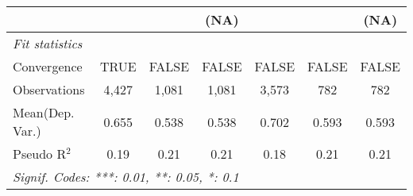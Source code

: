 \begin{tabular}{lcccccc}
                           &               &             & (NA)   &               &         & (NA)\\   
   \midrule
   \emph{Fit statistics}\\
   Convergence             &TRUE           & FALSE       & FALSE  & FALSE         & FALSE   & FALSE\\  
   Observations            & 4,427         & 1,081       & 1,081  & 3,573         & 782     & 782\\  
Mean(Dep. Var.) & 0.655 & 0.538 & 0.538 & 0.702 & 0.593 & 0.593 \\
   Pseudo R$^2$            & 0.19          & 0.21        & 0.21   & 0.18          & 0.21    & 0.21\\  
   \midrule \midrule
   \multicolumn{7}{l}{\emph{Signif. Codes: ***: 0.01, **: 0.05, *: 0.1}}\\
\end{tabular}
\par\endgroup
